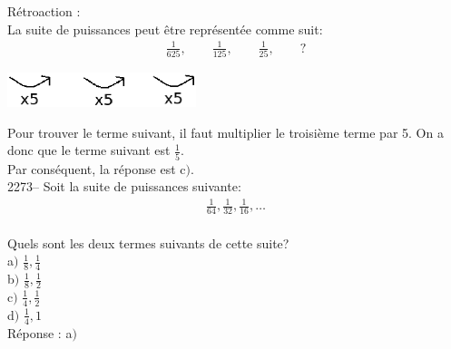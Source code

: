 \documentclass[letterpaper, 12pt]{article}
\begin{document}
R\'etroaction :\\
La suite de puissances peut \^etre repr\'esent\'ee comme suit:\\
\begin{eqnarray*}
\frac{1}{625},\qquad \frac{1}{125},\qquad \frac{1}{25},\qquad ?
\end{eqnarray*}
\begin{center}
 \includegraphics[width=5.5cm,bb=0 767 334 842]{Q2272.eps}
\end{center}
Pour trouver le terme suivant, il faut multiplier le troisi\`eme terme par 5. On a donc que le terme suivant est $\frac{1}{5}$.\\
Par cons\'equent, la r\'eponse est c$)$.\\

2273-- Soit la suite de puissances suivante:\\
\begin{eqnarray*}
\frac{1}{64}, \frac{1}{32}, \frac{1}{16},\ldots
\end{eqnarray*}\\
Quels sont les deux termes suivants de cette suite?\\

a$)$ $\frac{1}{8}, \frac{1}{4}$ \\[2mm]
b$)$ $\frac{1}{8}, \frac{1}{2}$\\[2mm]
c$)$ $\frac{1}{4}, \frac{1}{2}$\\[2mm]
d$)$ $\frac{1}{4}, 1$\\

R\'eponse : a$)$\\
\end{document}
